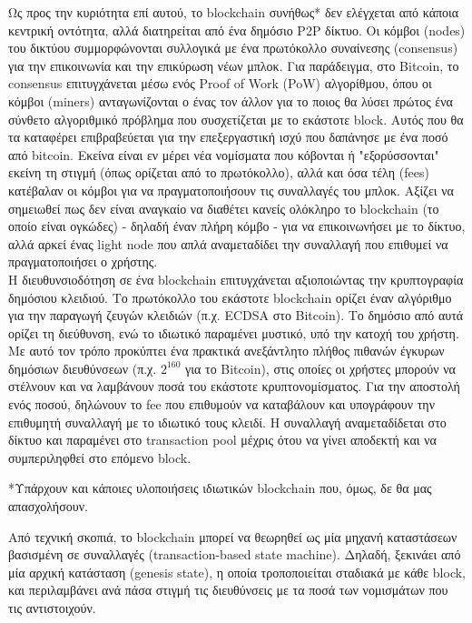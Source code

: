Ως προς την κυριότητα επί αυτού, το blockchain συνήθως* δεν ελέγχεται από κάποια κεντρική οντότητα, αλλά διατηρείται από ένα δημόσιο P2P δίκτυο. Οι κόμβοι (nodes) του δικτύου συμμορφώνονται συλλογικά με ένα πρωτόκολλο συναίνεσης (consensus) για την επικοινωνία και την επικύρωση νέων μπλοκ. Για παράδειγμα, στο Bitcoin, το consensus επιτυγχάνεται μέσω ενός Proof of Work (PoW) αλγορίθμου, όπου οι κόμβοι (miners) ανταγωνίζονται ο ένας τον άλλον για το ποιος θα λύσει πρώτος ένα σύνθετο αλγοριθμικό πρόβλημα που συσχετίζεται με το εκάστοτε block. Αυτός που θα τα καταφέρει επιβραβεύεται για την επεξεργαστική ισχύ που δαπάνησε με ένα ποσό από bitcoin. Εκείνα είναι εν μέρει νέα νομίσματα που κόβονται ή "εξορύσσονται" εκείνη τη στιγμή (όπως ορίζεται από το πρωτόκολλο), αλλά και όσα τέλη  (fees) κατέβαλαν οι κόμβοι για να πραγματοποιήσουν τις συναλλαγές του μπλοκ. Αξίζει να σημειωθεί πως δεν είναι αναγκαίο να διαθέτει κανείς ολόκληρο το blockchain (το οποίο είναι ογκώδες) - δηλαδή έναν πλήρη κόμβο - για να επικοινωνήσει με το δίκτυο, αλλά αρκεί ένας light node που απλά αναμεταδίδει την συναλλαγή που επιθυμεί να πραγματοποιήσει ο χρήστης.
\\
Η διευθυνσιοδότηση σε ένα blockchain επιτυγχάνεται αξιοποιώντας την κρυπτογραφία δημόσιου κλειδιού. Το πρωτόκολλο του εκάστοτε blockchain ορίζει έναν αλγόριθμο για την παραγωγή ζευγών κλειδιών (π.χ. ECDSA στο Bitcoin). Το δημόσιο από αυτά ορίζει τη διεύθυνση, ενώ το ιδιωτικό παραμένει μυστικό, υπό την κατοχή του χρήστη. Με αυτό τον τρόπο προκύπτει ένα πρακτικά ανεξάντλητο πλήθος πιθανών έγκυρων δημόσιων διευθύνσεων (π.χ. $2^{160}$ για το Bitcoin), στις οποίες οι χρήστες μπορούν να στέλνουν και να λαμβάνουν ποσά του εκάστοτε κρυπτονομίσματος. Για την αποστολή ενός ποσού, δηλώνουν το fee που επιθυμούν να καταβάλουν και υπογράφουν την επιθυμητή συναλλαγή με το ιδιωτικό τους κλειδί. Η συναλλαγή αναμεταδίδεται στο δίκτυο και παραμένει στο transaction pool μέχρις ότου να γίνει αποδεκτή και να συμπεριληφθεί στο επόμενο block.

*Υπάρχουν και κάποιες υλοποιήσεις ιδιωτικών blockchain που, όμως, δε θα μας απασχολήσουν.

Από τεχνική σκοπιά, το blockchain μπορεί να θεωρηθεί ως μία μηχανή καταστάσεων βασισμένη σε συναλλαγές (transaction-based state machine). Δηλαδή, ξεκινάει από μία αρχική κατάσταση (genesis state), η οποία τροποποιείται σταδιακά με κάθε block, και περιλαμβάνει ανά πάσα στιγμή τις διευθύνσεις με τα ποσά των νομισμάτων που τις αντιστοιχούν.

